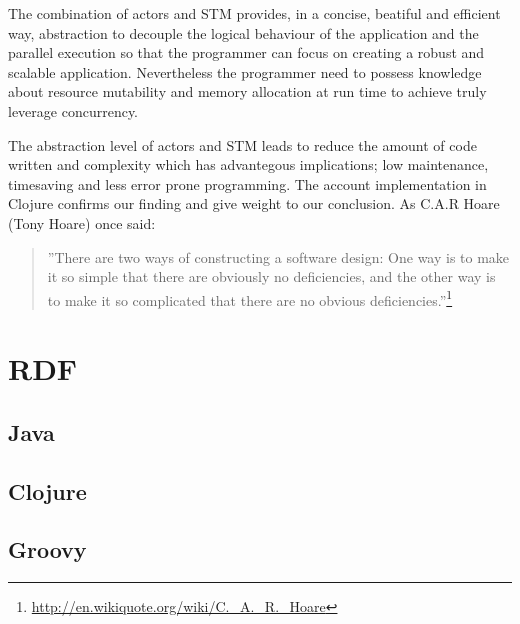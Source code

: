\documentclass[a4paper,12pt]{kth-mag}
\begin{document}
The combination of actors and STM provides, in a concise, beatiful and efficient way, abstraction to decouple the logical behaviour of the application and the parallel execution so that the programmer can focus on creating a robust and scalable application. Nevertheless the programmer need to possess knowledge about resource mutability and memory allocation at run time to achieve truly leverage concurrency.

The abstraction level of actors and STM leads to reduce the amount of code written and complexity which has advantegous implications; low maintenance, timesaving and less error prone programming. The account implementation in Clojure confirms our finding and give weight to our conclusion. As C.A.R Hoare (Tony Hoare) once said:
\begin{quote}
''There are two ways of constructing a software design: One way is to make it so simple that there are obviously no deficiencies, and the other way is to make it so complicated that there are no obvious deficiencies.''\footnote{\url{http://en.wikiquote.org/wiki/C._A._R._Hoare}}
\end{quote}

\appendix
\addappheadtotoc
\chapter{RDF}\label{appA}

\section{Java}

\section{Clojure}

\section{Groovy}
\end{document}
